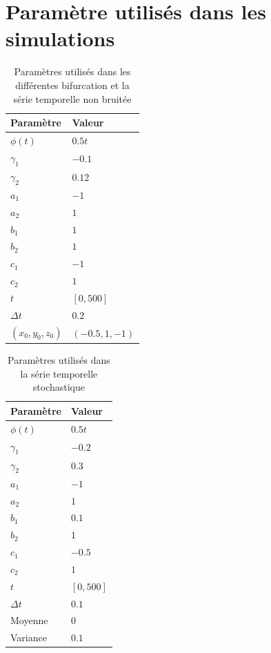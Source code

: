 \section{Paramètre utilisés dans les simulations}

\begin{table}[H]
\centering
\begin{tabular}{|l|l|}
  \hline
  Paramètre         & Valeur \\\hline
  $\phi(t)$         & $0.5t$ \\
  $\gamma_1$        & $-0.1$ \\
  $\gamma_2$        & $0.12$ \\
  $a_1$             & $-1$ \\
  $a_2$             & $1$ \\
  $b_1$             & $1$ \\
  $b_2$             & $1$ \\
  $c_1$             & $-1$ \\
  $c_2$             & $1$ \\
  $t$               & $[0, 500]$ \\
  $\Delta t$        & $0.2$ \\
  $(x_0, y_0, z_0)$ & $(-0.5, 1, -1)$ \\\hline
\end{tabular}
\caption{Paramètres utilisés dans les différentes bifurcation et la série temporelle non bruitée}
\label{tab:basic-parameters}
\end{table}

\begin{table}[H]
\centering
\begin{tabular}{|l|l|}
  \hline
  Paramètre       & Valeur \\\hline
  $\phi(t)$       & $0.5t$ \\
  $\gamma_1$      & $-0.2$ \\
  $\gamma_2$      & $0.3$ \\
  $a_1$           & $-1$ \\
  $a_2$           & $1$ \\
  $b_1$           & $0.1$ \\
  $b_2$           & $1$ \\
  $c_1$           & $-0.5$ \\
  $c_2$           & $1$ \\
  $t$             & $[0, 500]$ \\
  $\Delta t$      & $0.1$ \\
  Moyenne         & $0$ \\
  Variance        & $0.1$ \\\hline
\end{tabular}
\caption{Paramètres utilisés dans la série temporelle stochastique}
\label{tab:stochastic-parameters}
\end{table}
